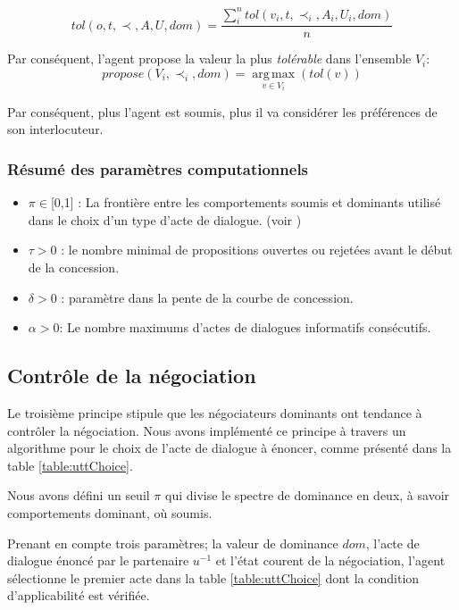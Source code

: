 	\begin{equation}
	tol(o, t, \prec, A, U, dom) = \frac{ \sum_{i}^{n} tol(v_i, t, \prec_i, A_i, U_i, dom) } {n}
	\end{equation}
	
	\noindent
	Par conséquent, l'agent propose la valeur la plus \emph{tolérable} dans l'ensemble $V_i$:
	\begin{equation}
	propose(V_i, \prec_i,dom) =  \operatorname*{arg\,max}_{v \in V_i} ( tol(v))
	\end{equation}
	
	Par conséquent, plus l'agent est soumis, plus il va considérer les préférences de son interlocuteur.
	
	\subsubsection*{Résumé des paramètres computationnels}
	\begin{itemize}[noitemsep]
		
		\item $\pi \in $[0,1] : La frontière entre  les comportements soumis et dominants utilisé dans le choix d'un type d'acte de dialogue. (voir )
		\item $\tau > 0$ : le nombre minimal de propositions ouvertes ou rejetées avant le début de la concession.
		\item $\delta > 0$ : paramètre dans la pente de la courbe de concession.
		\item $\alpha> 0$: Le nombre maximums d'actes de dialogues informatifs consécutifs.
	\end{itemize}
	
	\subsection{Contrôle de la négociation}
	
	Le troisième principe stipule que les négociateurs dominants ont tendance à contrôler la négociation.
	Nous avons implémenté ce principe à travers un algorithme pour le choix de l'acte de dialogue à énoncer, comme présenté dans la table \ref{table:uttChoice}.
	
	Nous avons défini un seuil $\pi$  qui divise le spectre de dominance en deux, à savoir comportements dominant, où soumis.
	
	Prenant en compte trois paramètres; la valeur de dominance $dom$, l'acte de dialogue énoncé par le partenaire $u^{-1}$ et l'état courent de la négociation, l'agent sélectionne le premier acte dans la table \ref{table:uttChoice} dont la condition d'applicabilité est vérifiée.  
	

